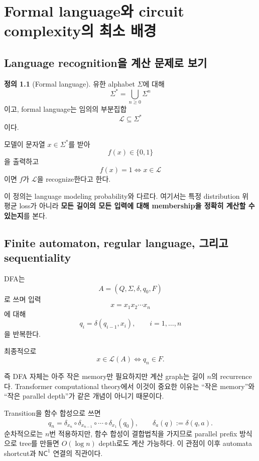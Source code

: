 \documentclass[11pt,a4paper,oneside,openany]{memoir}
\theoremstyle{definition}
\newtheorem{definition}{정의}[chapter]
\newcommand{\NC}{\mathsf{NC}}
\begin{document}
\chapter{Formal language와 circuit complexity의 최소 배경}

\section{Language recognition을 계산 문제로 보기}

\begin{definition}[Formal language]
유한 alphabet $\Sigma$에 대해
\[
\Sigma^*=\bigcup_{n\ge 0}\Sigma^n
\]
이고, formal language는 임의의 부분집합
\[
\mathcal L\subseteq \Sigma^*
\]
이다.
\end{definition}

모델이 문자열 $x\in\Sigma^*$를 받아
\[
f(x)\in\{0,1\}
\]
을 출력하고
\[
f(x)=1 \iff x\in\mathcal L
\]
이면 $f$가 $\mathcal L$을 recognize한다고 한다.

이 정의는 language modeling probability와 다르다. 여기서는 특정 distribution 위 평균 loss가 아니라
\textbf{모든 길이의 모든 입력에 대해 membership을 정확히 계산할 수 있는지}를 본다.

\section{Finite automaton, regular language, 그리고 sequentiality}

DFA는
\[
A=(Q,\Sigma,\delta,q_0,F)
\]
로 쓰며 입력
\[
x=x_1x_2\cdots x_n
\]
에 대해
\[
q_i=\delta(q_{i-1},x_i),\qquad i=1,\dots,n
\]
을 반복한다.

최종적으로
\[
x\in\mathcal L(A)\iff q_n\in F.
\]

즉 DFA 자체는 아주 작은 memory만 필요하지만 계산 graph는 길이 $n$의 recurrence다.
Transformer computational theory에서 이것이 중요한 이유는 ``작은 memory''와 ``작은 parallel depth''가 같은 개념이 아니기 때문이다.

\begin{suppbox}
Transition을 함수 합성으로 쓰면
\[
q_n=\delta_{x_n}\circ\delta_{x_{n-1}}\circ\cdots\circ\delta_{x_1}(q_0),
\qquad
\delta_a(q):=\delta(q,a).
\]
순차적으로는 $n$번 적용하지만, 함수 합성이 결합법칙을 가지므로 parallel prefix 방식으로 tree를 만들면
$O(\log n)$ depth로도 계산 가능하다. 이 관점이 이후 automata shortcut과 $\NC^1$ 연결의 직관이다.
\end{suppbox}
\end{document}
